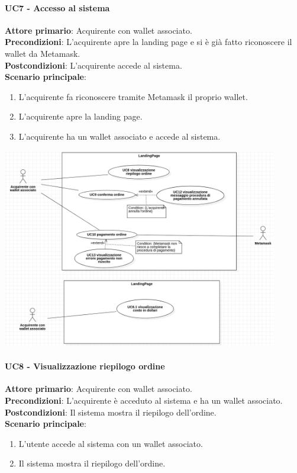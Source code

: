 \documentclass[a4paper, 12pt]{article}
\begin{document}
\paragraph{UC7 - Accesso al sistema}
\textbf{Attore primario}: Acquirente con wallet associato.\\
\textbf{Precondizioni}: L'acquirente apre la landing page e si è già fatto riconoscere il wallet da Metamask.\\
\textbf{Postcondizioni}: L'acquirente accede al sistema.\\
\textbf{Scenario principale}:
\begin{enumerate}
    \item L'acquirente fa riconoscere tramite Metamask il proprio wallet.
    \item L'acquirente apre la landing page.
    \item L'acquirente ha un wallet associato e accede al sistema.
\end{enumerate}

\includegraphics[width=0.9\textwidth]{UseCase_landing_page3}

\paragraph{UC8 - Visualizzazione riepilogo ordine}
\textbf{Attore primario}: Acquirente con wallet associato.\\
\textbf{Precondizioni}: L'acquirente è acceduto al sistema e ha un wallet associato.\\
\textbf{Postcondizioni}: Il sistema mostra il riepilogo dell'ordine.\\
\textbf{Scenario principale}:
\begin{enumerate}
    \item L’utente accede al sistema con un wallet associato.
    \item Il sistema mostra il riepilogo dell'ordine.
\end{enumerate}
\end{document}
